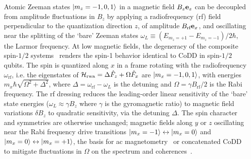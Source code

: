 \documentclass[aps,prl,reprint,superscriptaddress,floatfix]{revtex4-1}
\begin{document}

Atomic Zeeman states $\vert m_z=-1,0,1 \rangle $ in a magnetic field $B_z \mathbf{e}_z$ can be decoupled from amplitude fluctuations in $B_z$ by applying a radiofrequency (rf) field perpendicular to the quantization direction $z$, of amplitude $B_{\text{rf}} \mathbf{e}_x$, and oscillating near the splitting of the `bare' Zeeman states $\omega_L \equiv (E_{m_z=+1}-E_{m_z=-1})/2\hbar$, the Larmor frequency.
At low magnetic fields, the degeneracy of the composite spin-$1/2$ systems~\cite{majorana_atomi_1932}  renders the spin-1 behavior identical to CoDD in spin-$1/2$ qubits.
The spin is quantized along $x$ in a frame rotating with the radiofrequency $\omega_{\text{rf}}$, i.e. the eigenstates of $\mathcal{H}_{\text{rwa}} = \Delta \hat{F}_z + \Omega \hat{F}_x$ are $\vert m_x=-1,0,1 \rangle $, with energies $m_x \hbar \sqrt{\Omega^2 + \Delta^2}$, where $\Delta = \omega_{\text{rf}}-\omega_L$ is the detuning and $\Omega = \gamma B_{\text{rf}} / 2$ is the Rabi frequency.
The rf dressing reduces the leading-order linear sensitivity of the `bare' state energies ($\omega_L \approx \gamma B_z$ where $\gamma$ is the gyromagnetic ratio) to magnetic field variations $\delta B_z$ to quadratic sensitivity, via the detuning $\Delta$.
The spin character and symmetries are otherwise unchanged; magnetic fields along $y$ or $z$ oscillating near the Rabi frequency drive transitions $\vert m_x=-1 \rangle  \leftrightarrow \vert m_x=0 \rangle $ and $\vert m_x=0 \rangle  \leftrightarrow \vert m_x=+1 \rangle $, the basis for ac magnetometry~\cite{hirose_continuous_2012} or concatenated CoDD to mitigate fluctuations in $\Omega$ on the spectrum and coherences~\cite{cai_robust_2012}.
\end{document}
